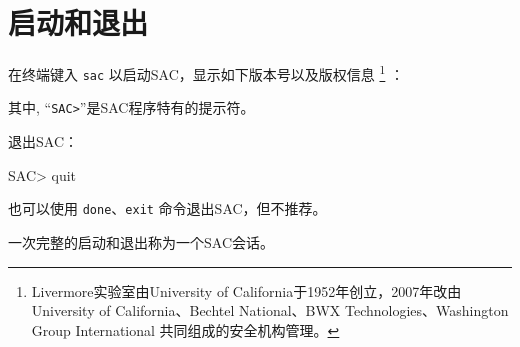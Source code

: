 \section{启动和退出}
在终端键入 \texttt{sac} 以启动SAC，显示如下版本号以及版权信息
\footnote{Livermore实验室由University of California于1952年创立，2007年改由
University of California、Bechtel National、BWX Technologies、Washington Group International
共同组成的安全机构管理。}
：
其中, ``\texttt{SAC>}''是SAC程序特有的提示符。

退出SAC：
\begin{SACCode}
SAC> quit
\end{SACCode}
也可以使用 \texttt{done}、\texttt{exit} 命令退出SAC，但不推荐。

一次完整的启动和退出称为一个SAC会话。